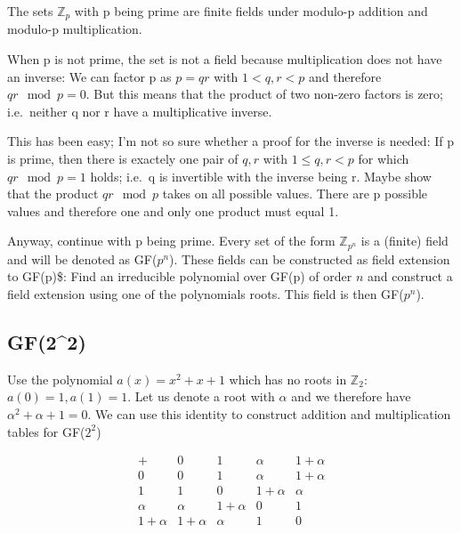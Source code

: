 
The sets \(\mathbb{Z}_p\) with p being prime are finite fields under
modulo-p addition and modulo-p multiplication.

When p is not prime, the set is not a field because multiplication does
not have an inverse: We can factor p as \(p=qr\) with \(1< q,r < p\) and
therefore \(qr \mod p = 0\). But this means that the product of two
non-zero factors is zero; i.e.~neither q nor r have a multiplicative
inverse.

This has been easy; I'm not so sure whether a proof for the inverse is
needed: If p is prime, then there is exactely one pair of \(q,r\) with
\(1 \leq q,r < p\) for which \(qr \mod p = 1\) holds; i.e.~q is
invertible with the inverse being r. Maybe show that the product
\(qr \mod p\) takes on all possible values. There are p possible values
and therefore one and only one product must equal 1.

Anyway, continue with p being prime. Every set of the form
\(\mathbb{Z}_{p^n}\) is a (finite) field and will be denoted as
GF(\(p^n\)). These fields can be constructed as field extension to
GF(p)\$: Find an irreducible polynomial over GF(p) of order \(n\) and
construct a field extension using one of the polynomials roots. This
field is then GF(\(p^n\)).

\subsection{GF(2\^{}2)}\label{gf22}

Use the polynomial \(a(x) = x^2+x+1\) which has no roots in
\(\mathbb{Z}_2\): \(a(0) = 1, a(1) = 1\). Let us denote a root with
\(\alpha\) and we therefore have \(\alpha^2+\alpha+1=0\). We can use
this identity to construct addition and multiplication tables for
GF(\(2^2\))

\[
\begin{array}{c|cccc}
+  &       0        & 1          & \alpha     & 1+\alpha \\
\hline
0 &        0        & 1          & \alpha     & 1+\alpha \\
1 &        1        & 0          & 1 + \alpha & \alpha   \\
\alpha &   \alpha   & 1 + \alpha & 0          & 1        \\
1+\alpha & 1+\alpha & \alpha     & 1          & 0        \\
\end{array}
\]

